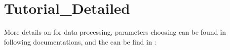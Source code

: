 \documentclass[a4paper,10pt,english,openany]{sphinxmanual}
\begin{document}



\section{Tutorial\_Detailed}
\label{\detokenize{tutorial_detailed:tutorial-detailed}}\label{\detokenize{tutorial_detailed::doc}}
More details on  for data processing, parameters choosing can be found in following documentations,
and the  can be find in :
\end{document}
